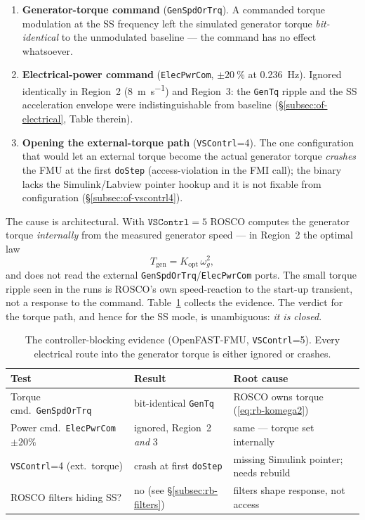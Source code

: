 \begin{enumerate}
  \item \textbf{Generator-torque command} (\texttt{GenSpdOrTrq}). A commanded
        torque modulation at the SS frequency left the simulated generator torque
        \emph{bit-identical} to the unmodulated baseline --- the command has no
        effect whatsoever.
  \item \textbf{Electrical-power command} (\texttt{ElecPwrCom},
        \(\pm\SI{20}{\percent}\) at \SI{0.236}{\hertz}). Ignored identically in
        Region~2 (\SI{8}{\metre\per\second}) and Region~3: the \texttt{GenTq}
        ripple and the SS acceleration envelope were indistinguishable from
        baseline (\S\ref{subsec:of-electrical}, Table therein).
  \item \textbf{Opening the external-torque path} (\texttt{VSContrl}=4). The one
        configuration that would let an external torque become the actual
        generator torque \emph{crashes} the FMU at the first \texttt{doStep}
        (access-violation in the FMI call); the binary lacks the
        Simulink/Labview pointer hookup and it is not fixable from configuration
        (\S\ref{subsec:of-vscontrl4}).
\end{enumerate}

The cause is architectural. With \(\texttt{VSContrl}=5\) ROSCO computes the
generator torque \emph{internally} from the measured generator speed --- in
Region~2 the optimal law
\begin{equation}
  T_{\mathrm{gen}} = K_{\mathrm{opt}}\,\omega_g^2,
  \label{eq:rb-komega2}
\end{equation}
and does not read the external \texttt{GenSpdOrTrq}/\texttt{ElecPwrCom} ports. The
small torque ripple seen in the runs is ROSCO's own speed-reaction to the start-up
transient, not a response to the command. Table~\ref{tab:rb-evidence} collects the
evidence. The verdict for the torque path, and hence for the SS mode, is
unambiguous: \emph{it is closed}.

\begin{table}[t]
  \centering
  \caption{The controller-blocking evidence (OpenFAST-FMU, \texttt{VSContrl}=5).
  Every electrical route into the generator torque is either ignored or crashes.}
  \label{tab:rb-evidence}
  \begin{tabular}{lll}
    \toprule
    Test & Result & Root cause \\
    \midrule
    Torque cmd.\ \texttt{GenSpdOrTrq}      & bit-identical \texttt{GenTq}        & ROSCO owns torque (\ref{eq:rb-komega2}) \\
    Power cmd.\ \texttt{ElecPwrCom} \(\pm20\%\) & ignored, Region~2 \emph{and} 3 & same --- torque set internally \\
    \texttt{VSContrl}=4 (ext.\ torque)     & crash at first \texttt{doStep}      & missing Simulink pointer; needs rebuild \\
    ROSCO filters hiding SS?               & no (see \S\ref{subsec:rb-filters})  & filters shape response, not access \\
    \bottomrule
  \end{tabular}
\end{table}

